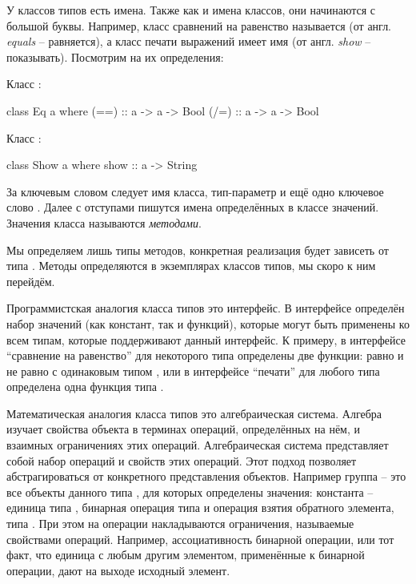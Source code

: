 У классов типов есть имена. Также как и имена классов, они начинаются с
большой буквы. Например, класс сравнений на равенство называется 
(от англ. \emph{equals} -- равняется), а класс печати выражений имеет
имя  (от англ. \emph{show} -- показывать). Посмотрим на их
определения:

Класс :


\begin{code}
class Eq a where
    (==) :: a -> a -> Bool
    (/=) :: a -> a -> Bool
\end{code}

Класс :


\begin{code}
class Show a where
    show :: a -> String
\end{code}

За ключевым словом  следует имя класса, тип-параметр и ещё
одно ключевое слово . Далее с отступами пишутся имена
определённых в классе значений. Значения класса называются
\emph{методами}.

Мы определяем лишь типы методов, конкретная реализация будет зависеть от
типа . Методы определяются в экземплярах классов типов, мы скоро к
ним перейдём.

Программистская аналогия класса типов это интерфейс. В интерфейсе
определён набор значений (как констант, так и функций), которые могут
быть применены ко всем типам, которые поддерживают данный интерфейс. К
примеру, в интерфейсе ``сравнение на равенство'' для некоторого типа
 определены две функции: равно \In{(==)} и не равно \In{(/=)} с
одинаковым типом , или в интерфейсе ``печати'' для
любого типа  определена одна функция  типа
.

Математическая аналогия класса типов это алгебраическая система. Алгебра
изучает свойства объекта в терминах операций, определённых на нём, и
взаимных ограничениях этих операций. Алгебраическая система представляет
собой набор операций и свойств этих операций. Этот подход позволяет
абстрагироваться от конкретного представления объектов. Например группа
-- это все объекты данного типа , для которых определены значения:
константа -- единица типа , бинарная операция типа
 и операция взятия обратного элемента, типа .
При этом на операции накладываются ограничения, называемые свойствами
операций. Например, ассоциативность бинарной операции, или тот факт, что
единица с любым другим элементом, применённые к бинарной операции, дают
на выходе исходный элемент.

